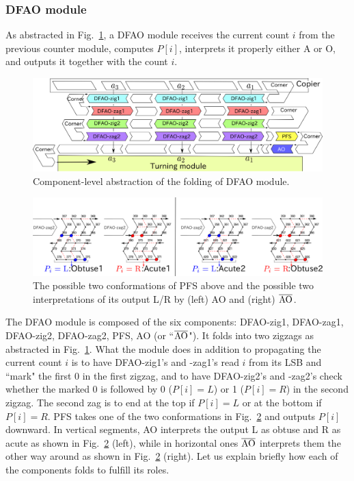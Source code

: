 			\subsubsection{DFAO module}


As abstracted in Fig.~\ref{fig:abst_dfao}, a DFAO module receives the current count $i$ from the previous counter module, computes $P[i]$, interprets it properly either A or O, and outputs it together with the count $i$. 

\begin{figure}[h]
\includegraphics[width=\linewidth]{pic/abst_DFAO.png}
\caption{Component-level abstraction of the folding of DFAO module.}
\label{fig:abst_dfao}
\end{figure}


\begin{figure}[h]
\includegraphics[width=\linewidth]{pic/PFS.png}
\caption{The possible two conformations of PFS above and the possible two interpretations of its output L/R by (left) AO and (right) $\overline{\rm AO}$.}
\label{fig:PFS}
\end{figure}


The DFAO module is composed of the six components: DFAO-zig1, DFAO-zag1, DFAO-zig2, DFAO-zag2, PFS, AO (or  ``$\overline{\rm AO}$").
It folds into two zigzags as abstracted in Fig.~\ref{fig:abst_dfao}.
What the module does in addition to propagating the current count $i$ is to have DFAO-zig1's and -zag1's read $i$ from its LSB and ``mark" the first 0 in the first zigzag, and to have DFAO-zig2's and -zag2's check whether the marked 0 is followed by 0 ($P[i] = L$) or 1 ($P[i] = R$) in the second zigzag.
The second zag is to end at the top if $P[i] = L$ or at the bottom if $P[i] = R$.
PFS takes one of the two conformations in Fig.~\ref{fig:PFS} and outputs $P[i]$ downward.
In vertical segments, AO interprets the output L as obtuse and R as acute as shown in Fig.~\ref{fig:PFS} (left), while in horizontal ones $\overline{\rm AO}$ interprets them the other way around as shown in Fig.~\ref{fig:PFS} (right). 
Let us explain briefly how each of the components folds to fulfill its roles.

